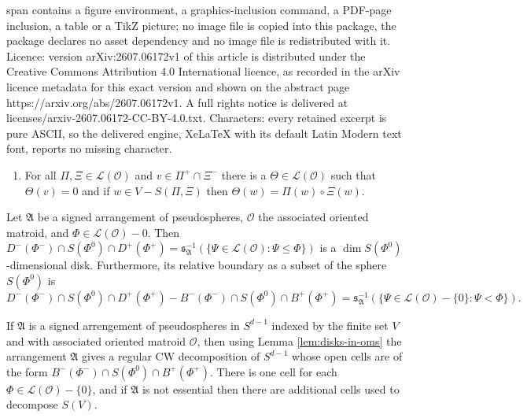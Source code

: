 \documentclass[10pt,a4paper]{amsart}
\begin{document}
span contains a figure environment, a graphics-inclusion command, a PDF-page inclusion, a table or a TikZ picture; no image file is copied into this package, the package declares no asset dependency and no image file is redistributed with it. Licence: version arXiv:2607.06172v1 of this article is distributed under the Creative Commons Attribution 4.0 International licence, as recorded in the arXiv licence metadata for this exact version and shown on the abstract page https://arxiv.org/abs/2607.06172v1. A full rights notice is delivered at licenses/arxiv-2607.06172-CC-BY-4.0.txt. Characters: every retained excerpt is pure ASCII, so the delivered engine, XeLaTeX with its default Latin Modern text font, reports no missing character.
    \begin{enumerate}[resume,label=\normalfont{(V\arabic*')}]
        \item\label{def:om:elim} For all $\Pi,\Xi\in\mathscr{L}(\mathscr{O})$ and $v\in\Pi^+\cap\Xi^-$ there is a $\Theta\in\mathscr{L}(\mathscr{O})$ such that $\Theta(v)=0$ and if $w\in V-S(\Pi,\Xi)$ then $\Theta(w)=\Pi(w)\circ\Xi(w)$.
    \end{enumerate}

\begin{lemma}\label{lem:disks-in-oms}
    Let $\mathfrak{A}$ be a signed arrangement of pseudospheres, $\mathscr{O}$ the associated oriented matroid, and $\Phi\in\mathscr{L}(\mathscr{O})-{0}$. Then  $D^-(\Phi^-)\cap S(\Phi^0)\cap D^+(\Phi^+)=\mathfrak{s}_\mathfrak{A}^{-1}(\{\Psi\in\mathscr{L}(\mathscr{O}):\Psi\leq\Phi\})$ is a $\dim S(\Phi^0)$-dimensional disk. Furthermore, its relative boundary as a subset of the sphere $S(\Phi^0)$ is 
    \[
        D^-(\Phi^-)\cap S(\Phi^0)\cap D^+(\Phi^+)-B^-(\Phi^-)\cap S(\Phi^0)\cap B^+(\Phi^+)=\mathfrak{s}_\mathfrak{A}^{-1}(\{\Psi\in\mathscr{L}(\mathscr{O})-\{0\}:\Psi<\Phi\}).
    \] 
\end{lemma}

\begin{observation}\label{obs:pseudospheres-regular-cw}
    If $\mathfrak{A}$ is a signed arrengement of pseudospheres in $S^{d-1}$ indexed by the finite set $V$ and with associated oriented matroid $\mathscr{O}$, then using Lemma \ref{lem:disks-in-oms} the arrangement $\mathfrak{A}$ gives a regular CW decomposition of $S^{d-1}$ whose open cells are of the form $B^-(\Phi^-)\cap S(\Phi^0)\cap B^+(\Phi^+)$. There is one cell for each $\Phi\in\mathscr{L}(\mathscr{O})-\{0\}$, and if $\mathfrak{A}$ is not essential then there are additional cells used to decompose $S(V)$.
\end{observation}
\end{document}
